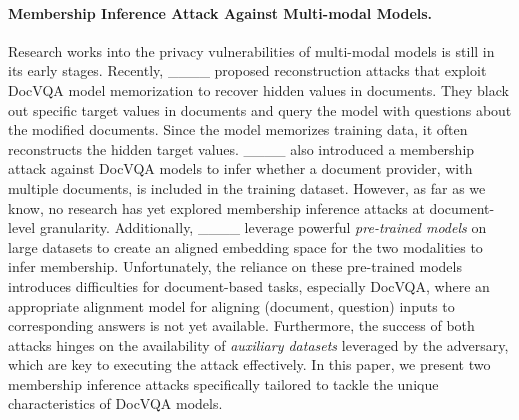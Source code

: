 \paragraph{Membership Inference Attack Against Multi-modal Models.} Research works into the privacy vulnerabilities of multi-modal models is still in its early stages. Recently, ____ proposed reconstruction attacks that exploit DocVQA model memorization to recover hidden values in documents. They black out specific target values in documents and query the model with questions about the modified documents. Since the model memorizes training data, it often reconstructs the hidden target values. ____ also introduced a membership attack against DocVQA models to infer whether a document provider, with multiple documents, is included in the training dataset. However, as far as we know, no research has yet explored membership inference attacks at document-level granularity. Additionally, ____ leverage powerful \textit{pre-trained models} on large datasets to create an aligned embedding space for the two modalities to infer membership. Unfortunately, the reliance on these pre-trained models introduces difficulties for document-based tasks, especially DocVQA, where an appropriate alignment model for aligning (document, question) inputs to corresponding answers is not yet available. Furthermore, the success of both attacks hinges on the availability of \textit{auxiliary datasets} leveraged by the adversary, which are key to executing the attack effectively. In this paper, we present two membership inference attacks specifically tailored to tackle the unique characteristics of DocVQA models.